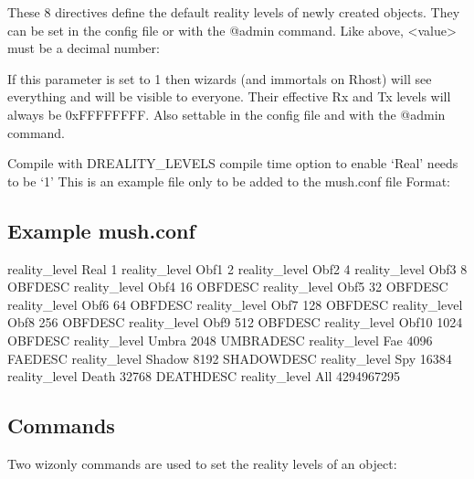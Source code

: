 \documentclass[letterpaper,10pt,english]{sphinxmanual}
\begin{document}
\sphinxAtStartPar
These 8 directives define the default reality levels of newly created
objects. They can be set in the config file or with the @admin command.
Like above, \textless{}value\textgreater{} must be a decimal number:

\begin{sphinxVerbatim}[commandchars=\\\{\}]
 
\end{sphinxVerbatim}

\sphinxAtStartPar
If this parameter is set to 1 then wizards (and immortals on Rhost) will see
everything and will be visible to everyone. Their effective Rx and Tx levels
will always be 0xFFFFFFFF. Also settable in the config file and with the
@admin command.

\sphinxAtStartPar
Compile with \sphinxhyphen{}DREALITY\_LEVELS compile time option to enable ‘Real’ needs to be ‘1’
This is an example file only to be added to the mush.conf file Format:

\begin{sphinxVerbatim}[commandchars=\\\{\}]
       
\end{sphinxVerbatim}


\subsection{Example mush.conf}
\label{\detokenize{advanced:example-mush-conf}}
\sphinxAtStartPar
reality\_level Real 1
reality\_level Obf1 2
reality\_level Obf2 4
reality\_level Obf3 8 OBFDESC
reality\_level Obf4 16 OBFDESC
reality\_level Obf5 32 OBFDESC
reality\_level Obf6 64 OBFDESC
reality\_level Obf7 128 OBFDESC
reality\_level Obf8 256 OBFDESC
reality\_level Obf9 512 OBFDESC
reality\_level Obf10 1024 OBFDESC
reality\_level Umbra 2048 UMBRADESC
reality\_level Fae 4096 FAEDESC
reality\_level Shadow 8192 SHADOWDESC
reality\_level Spy 16384
reality\_level Death 32768 DEATHDESC
reality\_level All 4294967295


\subsection{Commands}
\label{\detokenize{advanced:commands}}
\sphinxAtStartPar
Two wiz\sphinxhyphen{}only commands are used to set the reality levels of an object:
\end{document}
